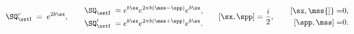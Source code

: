 \begin{equation}
\SQ_{\rm\sst I}^c{}\;=\;e^{2b\sx}, \qquad
\begin{aligned}
\SQ_{\rm\sst I}^{}\;=\;& e^{b\sx}e^{2\pi b (\mss-\spp)}e^{b\sx},\\
\SQ_{\rm\sst I}'{}\;=\;& e^{b\sx}e^{2\pi b (\mss+\spp)}e^{b\sx}.
\end{aligned}
\qquad [\sx,\spp]=\frac{i}{2},
\qquad 
\begin{aligned}
{[}\sx,\mss{]}=& 0,\\
[\spp,\mss]= & 0.
\end{aligned}
\end{equation}

